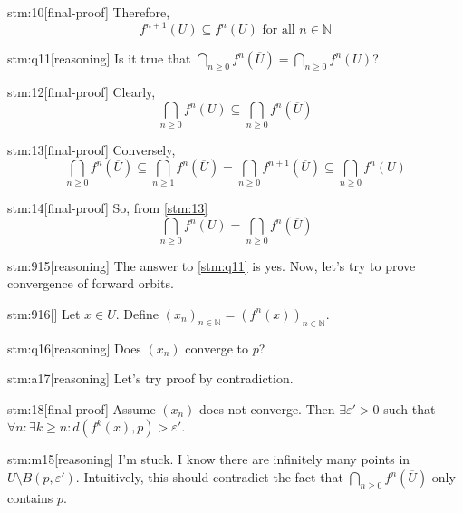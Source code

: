 \begin{stm}{stm:10}[final-proof]
Therefore, 
$$f^{n+1}(U) \subseteq f^n(U) \text{ for all } n \in \mathbb{N}$$
\end{stm}
    
\begin{stm}{stm:q11}[reasoning]
Is it true that $\bigcap_{n \ge 0} f^n(\overline{U}) = \bigcap_{n \ge 0} f^n(U)$?
\end{stm}

\begin{stm}{stm:12}[final-proof]
Clearly,
$$\bigcap_{n \ge 0} f^n(U) \subseteq \bigcap_{n \ge 0} f^n(\overline{U})$$
\end{stm}

\begin{stm}{stm:13}[final-proof]
Conversely, 
$$\bigcap_{n \ge 0} f^n(\overline{U}) \subseteq \bigcap_{n \ge 1} f^n(\overline{U}) = \bigcap_{n \ge 0} f^{n+1}(\overline{U}) \subseteq \bigcap_{n \ge 0} f^n(U)$$
\end{stm}

\begin{stm}{stm:14}[final-proof]
So, from \ref{stm:13}
$$\bigcap_{n \ge 0} f^n(U) = \bigcap_{n \ge 0} f^n(\overline{U})$$
\end{stm}

\begin{stm}{stm:915}[reasoning]
The answer to \ref{stm:q11} is yes. Now, let's try to prove convergence of forward orbits. 
\end{stm}

\begin{stm}{stm:916}[]
Let $x \in U$. Define $(x_n)_{n \in \mathbb{N}} = (f^n(x))_{n \in \mathbb{N}}$.
\end{stm}

\begin{stm}{stm:q16}[reasoning]
Does $(x_n)$ converge to $p$?
\end{stm}

\begin{stm}{stm:a17}[reasoning]
Let's try proof by contradiction. 
\end{stm}

\begin{stm}{stm:18}[final-proof]
Assume $(x_n)$ does not converge. Then $\exists \varepsilon' > 0$ such that $\forall n : \exists k \ge n : d(f^k(x), p) > \varepsilon'$.
\end{stm}

\begin{stm}{stm:m15}[reasoning]
I'm stuck. I know there are infinitely many points in $U \setminus B(p, \varepsilon')$. Intuitively, this should contradict the fact that $\bigcap_{n \ge 0} f^n(\overline{U})$ only contains $p$.
\end{stm}

